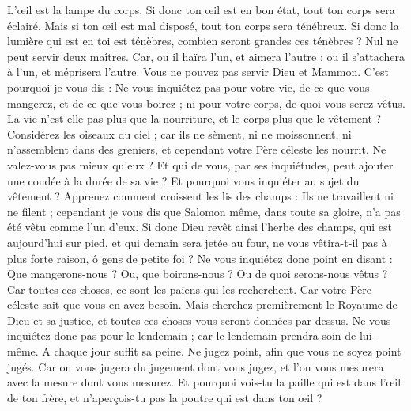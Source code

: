 \begin{multicols}{2}
L’œil est la lampe du corps. Si donc ton œil est en bon état, tout ton corps sera éclairé.
Mais si ton œil est mal disposé, tout ton corps sera ténébreux. Si donc la lumière qui est en toi est ténèbres, combien seront grandes ces ténèbres ?
Nul ne peut servir deux maîtres. Car, ou il haïra l'un, et aimera l'autre ; ou il s'attachera à l'un, et méprisera l'autre. Vous ne pouvez pas servir Dieu et Mammon{}.
C'est pourquoi je vous dis : Ne vous inquiétez pas pour votre vie, de ce que vous mangerez, et de ce que vous boirez ; ni pour votre corps, de quoi vous serez vêtus. La vie n'est-elle pas plus que la nourriture, et le corps plus que le vêtement ?
Considérez les oiseaux du ciel ; car ils ne sèment, ni ne moissonnent, ni n'assemblent dans des greniers, et cependant votre Père céleste les nourrit. Ne valez-vous pas mieux qu'eux ?
Et qui de vous, par ses inquiétudes, peut ajouter une coudée à la durée de sa vie ?
Et pourquoi vous inquiéter au sujet du vêtement ? Apprenez comment croissent les lis des champs : Ils ne travaillent ni ne filent ;
cependant je vous dis que Salomon même, dans toute sa gloire, n'a pas été vêtu comme l'un d'eux.
Si donc Dieu revêt ainsi l'herbe des champs, qui est aujourd'hui sur pied, et qui demain sera jetée au four, ne vous vêtira-t-il pas à plus forte raison, ô gens de petite foi ?
Ne vous inquiétez donc point en disant : Que mangerons-nous ? Ou, que boirons-nous ? Ou de quoi serons-nous vêtus ?
Car toutes ces choses, ce sont les païens qui les recherchent. Car votre Père céleste sait que vous en avez besoin.
Mais cherchez premièrement le Royaume de Dieu et sa justice, et toutes ces choses vous seront données par-dessus.
Ne vous inquiétez donc pas pour le lendemain ; car le lendemain prendra soin de lui-même. A chaque jour suffit sa peine.
\VerseOne{}Ne jugez point, afin que vous ne soyez point jugés.
Car on vous jugera du jugement dont vous jugez, et l’on vous mesurera avec la mesure dont vous mesurez.
Et pourquoi vois-tu la paille qui est dans l’œil de ton frère, et n’aperçois-tu pas la poutre qui est dans ton œil ?

\end{multicols}
